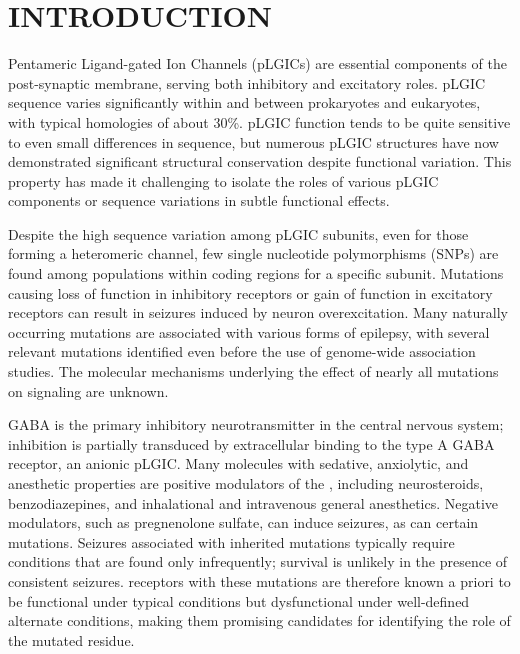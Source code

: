 \documentclass[9pt,twocolumn,twoside,lineno]{pnas-new}
\begin{document}

\section*{INTRODUCTION}

\newcommand{\WT}{WT\xspace}
\newcommand{\MT}{K289M\xspace}
\newcommand{\RMSD}{RMSD\textsubscript{symm}\xspace}
\newcommand{\WTs}{WT systems\xspace}
\newcommand{\MTs}{K289M systems\xspace}
\newcommand{\RMSDs}{RMSDs\textsubscript{symm}\xspace}

  Pentameric Ligand-gated Ion Channels (pLGICs) are essential components of the post-synaptic membrane, serving both inhibitory and excitatory roles.  pLGIC sequence varies significantly within and between prokaryotes and eukaryotes,\cite{Jaiteh2016} with typical homologies of about 30\%.  pLGIC function tends to be quite sensitive to even small differences in sequence, but numerous pLGIC structures have now demonstrated significant structural conservation despite functional variation.  This property has made it challenging to isolate the roles of various pLGIC components or sequence variations in subtle functional effects.  
    
  Despite the high sequence variation among pLGIC subunits, even for those forming a heteromeric channel, few single nucleotide polymorphisms (SNPs) are found among populations within coding regions for a specific subunit.   Mutations causing loss of function in inhibitory receptors or gain of function in excitatory receptors can result in seizures induced by neuron overexcitation. Many naturally occurring mutations are associated with various forms of epilepsy\cite{Bianchi2002,Cossette2002,Kang2004,Macdonald2004}, with several relevant mutations identified even before the use of genome-wide association studies. The molecular mechanisms underlying the effect of nearly all mutations on signaling are unknown.

GABA is the primary inhibitory neurotransmitter in the central nervous system; inhibition is partially transduced by extracellular binding to the type A GABA receptor, an anionic pLGIC\cite{Olsen1990,Macdonald1994,Rabow1995}. Many molecules with sedative, anxiolytic, and anesthetic properties are positive modulators of the \GABAA, including neurosteroids\cite {Mihic1997,Belelli2005a, Mitchell2008,Lambert2009,Olsen2011a}, benzodiazepines\cite{Sigel1997}, and inhalational and intravenous general anesthetics\cite {Krasowski1999,Harris1995,Miller2002}. Negative modulators, such as pregnenolone sulfate\cite{Majewska1988}, can induce seizures, as can certain mutations. Seizures associated with inherited mutations typically require conditions that are found only infrequently; survival is unlikely in the presence of consistent seizures.  \GABAA receptors with these mutations are therefore known a priori to be functional under typical conditions but dysfunctional under well-defined alternate conditions, making them promising candidates for identifying the role of the mutated residue.   
\end{document}
